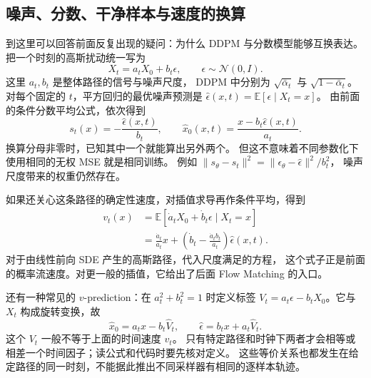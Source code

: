 \subsection{噪声、分数、干净样本与速度的换算}
到这里可以回答前面反复出现的疑问：为什么 DDPM 与分数模型能够互换表达。
把一个时刻的高斯扰动统一写为
\[
X_t=a_tX_0+b_t\epsilon,\qquad \epsilon\sim\mathcal N(0,I).
\]
这里 $a_t,b_t$ 是整体路径的信号与噪声尺度，
DDPM 中分别为 $\sqrt{\bar\alpha_t}$ 与 $\sqrt{1-\bar\alpha_t}$。
对每个固定的 $t$，平方回归的最优噪声预测是
$\hat\epsilon(x,t)=\mathbb E[\epsilon\mid X_t=x]$。
由前面的条件分数平均公式，依次得到
\[
s_t(x)=-\frac{\hat\epsilon(x,t)}{b_t},\qquad
\hat x_0(x,t)=\frac{x-b_t\hat\epsilon(x,t)}{a_t}.
\]
换算分母非零时，已知其中一个就能算出另外两个。
但这不意味着不同参数化下使用相同的无权 MSE 就是相同训练。
例如 $\|s_\theta-s_t\|^2=\|\epsilon_\theta-\hat\epsilon\|^2/b_t^2$，
噪声尺度带来的权重仍然存在。

如果还关心这条路径的确定性速度，对插值求导再作条件平均，得到
\begin{align}
v_t(x)&=\mathbb E[\dot a_tX_0+\dot b_t\epsilon\mid X_t=x]\\
&=\frac{\dot a_t}{a_t}x+
 \left(\dot b_t-\frac{\dot a_tb_t}{a_t}\right)\hat\epsilon(x,t).
\end{align}
对于由线性前向 SDE 产生的高斯路径，代入尺度满足的方程，
这个式子正是前面的概率流速度。对更一般的插值，它给出了后面 Flow Matching 的入口。

还有一种常见的 $v$-prediction：在 $a_t^2+b_t^2=1$ 时定义标签
$V_t=a_t\epsilon-b_tX_0$。它与 $X_t$ 构成旋转变换，故
\[
\hat x_0=a_tx-b_t\hat V_t,\qquad
\hat\epsilon=b_tx+a_t\hat V_t.
\]
这个 $V_t$ 一般不等于上面的时间速度 $v_t$。
只有特定路径和时钟下两者才会相等或相差一个时间因子；读公式和代码时要先核对定义。
这些等价关系也都发生在给定路径的同一时刻，不能据此推出不同采样器有相同的逐样本轨迹。
\cite{theorybook,flow-guide}
